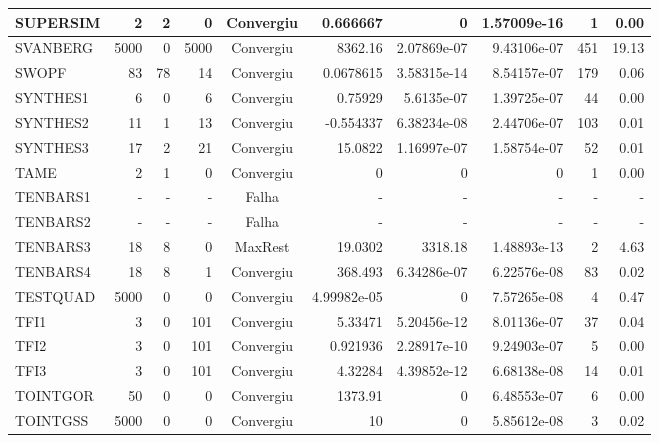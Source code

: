 \begin{center}
\begin{longtable}{|l|r|r|r|c|r|r|r|r|r|}
SUPERSIM &      2 &      2 &      0 & Convergiu  &    0.666667 &              0 & 1.57009e-16 &      1 &    0.00 \\ \hline
SVANBERG &   5000 &      0 &   5000 & Convergiu  &     8362.16 &    2.07869e-07 & 9.43106e-07 &    451 &   19.13 \\ \hline
   SWOPF &     83 &     78 &     14 & Convergiu  &   0.0678615 &    3.58315e-14 & 8.54157e-07 &    179 &    0.06 \\ \hline
SYNTHES1 &      6 &      0 &      6 & Convergiu  &     0.75929 &     5.6135e-07 & 1.39725e-07 &     44 &    0.00 \\ \hline
SYNTHES2 &     11 &      1 &     13 & Convergiu  &   -0.554337 &    6.38234e-08 & 2.44706e-07 &    103 &    0.01 \\ \hline
SYNTHES3 &     17 &      2 &     21 & Convergiu  &     15.0822 &    1.16997e-07 & 1.58754e-07 &     52 &    0.01 \\ \hline
    TAME &      2 &      1 &      0 & Convergiu  &           0 &              0 &           0 &      1 &    0.00 \\ \hline
TENBARS1 & - & - & - & Falha & - & - & - & - & - \\ \hline
TENBARS2 & - & - & - & Falha & - & - & - & - & - \\ \hline
TENBARS3 &     18 &      8 &      0 & MaxRest    &     19.0302 &        3318.18 & 1.48893e-13 &      2 &    4.63 \\ \hline
TENBARS4 &     18 &      8 &      1 & Convergiu  &     368.493 &    6.34286e-07 & 6.22576e-08 &     83 &    0.02 \\ \hline
TESTQUAD &   5000 &      0 &      0 & Convergiu  & 4.99982e-05 &              0 & 7.57265e-08 &      4 &    0.47 \\ \hline
    TFI1 &      3 &      0 &    101 & Convergiu  &     5.33471 &    5.20456e-12 & 8.01136e-07 &     37 &    0.04 \\ \hline
    TFI2 &      3 &      0 &    101 & Convergiu  &    0.921936 &    2.28917e-10 & 9.24903e-07 &      5 &    0.00 \\ \hline
    TFI3 &      3 &      0 &    101 & Convergiu  &     4.32284 &    4.39852e-12 & 6.68138e-08 &     14 &    0.01 \\ \hline
TOINTGOR &     50 &      0 &      0 & Convergiu  &     1373.91 &              0 & 6.48553e-07 &      6 &    0.00 \\ \hline
TOINTGSS &   5000 &      0 &      0 & Convergiu  &          10 &              0 & 5.85612e-08 &      3 &    0.02 \\ \hline

\end{longtable}
\end{center}
